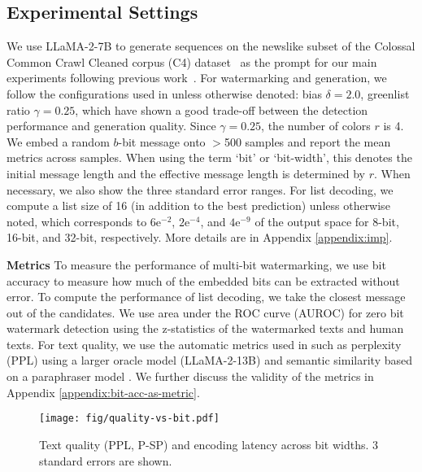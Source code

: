 
\subsection{Experimental Settings}
We use LLaMA-2-7B \citep{touvron2023llama} to generate sequences on the newslike subset of the Colossal Common Crawl Cleaned corpus (C4) dataset~\citep{raffel2020exploring} as the prompt for our main experiments following previous work~\citep{kirchenbauer2023watermark}. For watermarking and generation, we follow the configurations used in \citet{kirchenbauer2023reliability} unless otherwise denoted: bias $\delta=2.0$, greenlist ratio $\gamma=0.25$, which have shown a good trade-off between the detection performance and generation quality. Since $\gamma=0.25$, the number of colors $r$ is 4. We embed a random $b$-bit message onto $>$500 samples and report the mean metrics across samples.
When using the term `bit' or `bit-width', this denotes the initial message length and the effective message length is determined by $r$. When necessary, we also show the three standard error ranges. For list decoding, we compute a list size of 16 (in addition to the best prediction) unless otherwise noted, which corresponds to $6\mathrm{e}^{-2}$, $2\mathrm{e}^{-4}$, and $4\mathrm{e}^{-9}$ of the output space for 8-bit, 16-bit, and 32-bit, respectively. More details are in Appendix \ref{appendix:imp}.



\noindent\textbf{Metrics} To measure the performance of multi-bit watermarking, we use bit accuracy to measure how much of the embedded bits can be extracted without error. To compute the performance of list decoding, we take the closest message out of the candidates. We use area under the ROC curve (AUROC) for zero bit watermark detection using the z-statistics of the watermarked texts and human texts. For text quality, we use the automatic metrics used in \citet{kirchenbauer2023reliability} such as perplexity (PPL) using a larger oracle model (LLaMA-2-13B) and semantic similarity based on a paraphraser model \citep[P-SP]{wieting2022paraphrastic}. We further discuss the validity of the metrics in Appendix \ref{appendix:bit-acc-as-metric}.

\begin{wrapfigure}{R}{0.40\textwidth}
    \texttt{[image: fig/quality-vs-bit.pdf]}
    \caption{Text quality (PPL, P-SP) and encoding latency across bit widths. 3 standard errors are shown.}\label{fig:quality-vs-bit}
\end{wrapfigure}


